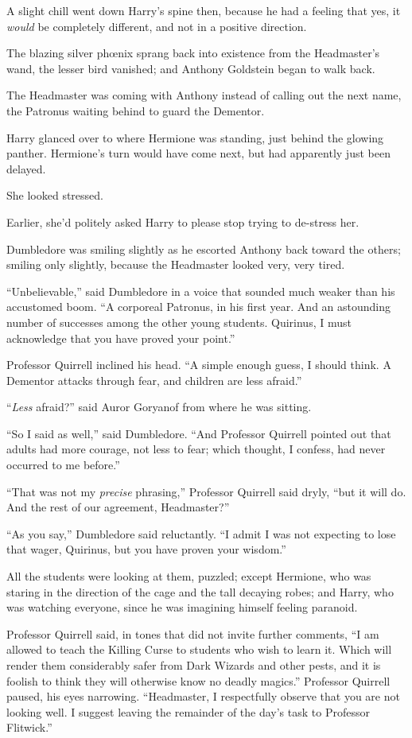 A slight chill went down Harry’s spine then, because he had a feeling that yes, it \emph{would} be completely different, and not in a positive direction.

The blazing silver phœnix sprang back into existence from the Headmaster’s wand, the lesser bird vanished; and Anthony Goldstein began to walk back.

The Headmaster was coming with Anthony instead of calling out the next name, the Patronus waiting behind to guard the Dementor.

Harry glanced over to where Hermione was standing, just behind the glowing panther. Hermione’s turn would have come next, but had apparently just been delayed.

She looked stressed.

Earlier, she’d politely asked Harry to please stop trying to de-stress her.

Dumbledore was smiling slightly as he escorted Anthony back toward the others; smiling only slightly, because the Headmaster looked very, very tired.

“Unbelievable,” said Dumbledore in a voice that sounded much weaker than his accustomed boom. “A corporeal Patronus, in his first year. And an astounding number of successes among the other young students. Quirinus, I must acknowledge that you have proved your point.”

Professor Quirrell inclined his head. “A simple enough guess, I should think. A Dementor attacks through fear, and children are less afraid.”

“\emph{Less} afraid?” said Auror Goryanof from where he was sitting.

“So I said as well,” said Dumbledore. “And Professor Quirrell pointed out that adults had more courage, not less to fear; which thought, I confess, had never occurred to me before.”

“That was not my \emph{precise} phrasing,” Professor Quirrell said dryly, “but it will do. And the rest of our agreement, Headmaster?”

“As you say,” Dumbledore said reluctantly. “I admit I was not expecting to lose that wager, Quirinus, but you have proven your wisdom.”

All the students were looking at them, puzzled; except Hermione, who was staring in the direction of the cage and the tall decaying robes; and Harry, who was watching everyone, since he was imagining himself feeling paranoid.

Professor Quirrell said, in tones that did not invite further comments, “I am allowed to teach the Killing Curse to students who wish to learn it. Which will render them considerably safer from Dark Wizards and other pests, and it is foolish to think they will otherwise know no deadly magics.” Professor Quirrell paused, his eyes narrowing. “Headmaster, I respectfully observe that you are not looking well. I suggest leaving the remainder of the day’s task to Professor Flitwick.”

